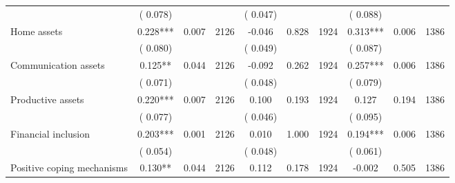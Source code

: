 \begin{tabular}{l*{9}{c}}
                               &        (       0.078) & &                                                                 &       (       0.047) & &                                                          &       (       0.088) & &  \\ 
 Home assets                 &              0.228***          &        0.007 & 2126          &             -0.046 &        0.828 & 1924                   &        0.313*** &        0.006 & 1386                 \\ 
                               &        (       0.080) & &                                                                 &       (       0.049) & &                                                          &       (       0.087) & &  \\ 
 Communication assets                 &              0.125**          &        0.044 & 2126          &             -0.092 &        0.262 & 1924                   &        0.257*** &        0.006 & 1386                 \\ 
                               &        (       0.071) & &                                                                 &       (       0.048) & &                                                          &       (       0.079) & &   \\ 
 Productive assets                 &              0.220***          &        0.007 & 2126          &              0.100 &        0.193 & 1924                   &        0.127 &        0.194 & 1386                 \\ 
                               &        (       0.077) & &                                                                 &       (       0.046) & &                                                          &       (       0.095) & &   \\ 
 Financial inclusion                 &              0.203***          &        0.001 & 2126          &              0.010 &        1.000 & 1924                   &        0.194*** &        0.006 & 1386                 \\ 
                               &        (       0.054) & &                                                                 &       (       0.048) & &                                                          &       (       0.061) & &  \\ 
 Positive coping mechanisms                &              0.130**        &        0.044 & 2126        &              0.112 &        0.178 & 1924               &       -0.002 &        0.505 & 1386       \\ 

\end{tabular}
